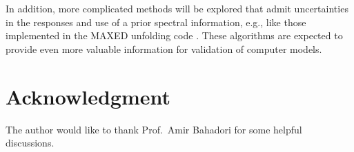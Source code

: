 \documentclass[journal]{IEEEtran}
\begin{document}
In addition, more complicated methods will be explored that admit uncertainties in the responses and use of a prior spectral information, e.g., like those implemented in the MAXED unfolding code \cite{reginatto1999maxed, reginatto2002spectrum}.  These algorithms  are expected to provide even more valuable information for validation of computer models.



 
\section*{Acknowledgment}


The author would like to thank Prof.~Amir Bahadori for some helpful discussions.


\ifCLASSOPTIONcaptionsoff
  \newpage
\fi






%
%



% 
\end{document}
